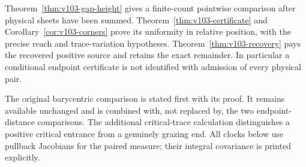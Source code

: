 \documentclass[11pt,reqno]{amsart}
\numberwithin{equation}{section}
\theoremstyle{definition}\newtheorem{definition}[theorem]{Definition}
\theoremstyle{remark}\newtheorem{remark}[theorem]{Remark}
\begin{document}
Theorem~\ref{thm:v103-gap-height} gives a finite-count pointwise
comparison after physical sheets have been summed. Theorem~\ref{thm:v103-certificate}
and Corollary~\ref{cor:v103-corners} prove its uniformity in relative
position, with the precise reach and trace-variation hypotheses.
Theorem~\ref{thm:v103-recovery} pays the recovered positive source
and retains the exact remainder. In particular a conditional endpoint
certificate is not identified with admission of every physical pair.

The original barycentric comparison is stated first with its proof.
It remains available unchanged and is combined with, not replaced by,
the two endpoint-distance comparisons. The additional critical-trace
calculation distinguishes a positive critical entrance from a genuinely
grazing end. All clocks below use pullback Jacobians for the paired
measure; their integral covariance is printed explicitly.









\appendix


\end{document}
